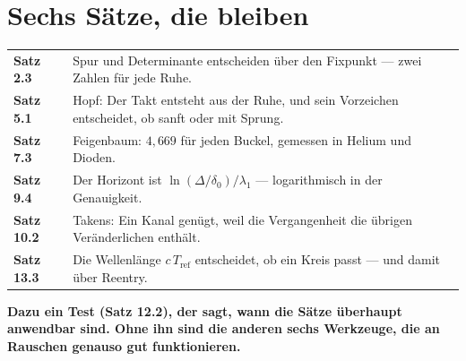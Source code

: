 \section{Sechs Sätze, die bleiben}

\begin{merksatz}
\begin{center}
{\small
\renewcommand{\arraystretch}{1.5}
\begin{tabular}{@{}P{2.0cm}P{6.6cm}@{}}
\toprule
\textbf{Satz 2.3} & Spur und Determinante entscheiden über den Fixpunkt --- zwei Zahlen für jede Ruhe.\\
\textbf{Satz 5.1} & Hopf: Der Takt entsteht aus der Ruhe, und sein Vorzeichen entscheidet, ob sanft oder mit Sprung.\\
\textbf{Satz 7.3} & Feigenbaum: $4{,}669$ für jeden Buckel, gemessen in Helium und Dioden.\\
\textbf{Satz 9.4} & Der Horizont ist $\ln(\Delta/\delta_0)/\lambda_1$ --- logarithmisch in der Genauigkeit.\\
\textbf{Satz 10.2} & Takens: Ein Kanal genügt, weil die Vergangenheit die übrigen Veränderlichen enthält.\\
\textbf{Satz 13.3} & Die Wellenlänge $c\,T_{\mathrm{ref}}$ entscheidet, ob ein Kreis passt --- und damit über Reentry.\\
\bottomrule
\end{tabular}}
\end{center}

\begin{center}
\begin{minipage}{0.9\textwidth}
\textbf{Dazu ein Test (Satz 12.2), der sagt, wann die Sätze überhaupt anwendbar sind. Ohne ihn sind die anderen sechs Werkzeuge, die an Rauschen genauso gut funktionieren.}
\end{minipage}
\end{center}
\end{merksatz}

